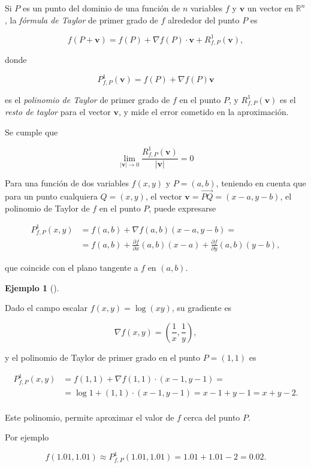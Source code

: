 \documentclass[
  a4paper,
]{scrreport}
\theoremstyle{definition}
\theoremstyle{plain}
\theoremstyle{plain}
\theoremstyle{definition}
\theoremstyle{definition}
\newtheorem{example}{Ejemplo}[chapter]
\theoremstyle{plain}
\theoremstyle{remark}
\begin{document}
Si \(P\) es un punto del dominio de una función de \(n\) variables \(f\)
y \(\mathbf{v}\) un vector en \(\mathbb{R}^n\), la \emph{fórmula de
Taylor} de primer grado de \(f\) alrededor del punto \(P\) es

\[
f(P+\mathbf{v}) = f(P) + \nabla f(P)\cdot \mathbf{v} +R^1_{f,P}(\mathbf{v}),
\]

donde

\[
P^1_{f,P}(\mathbf{v}) = f(P)+\nabla f(P)\mathbf{v}
\]

es el \emph{polinomio de Taylor} de primer grado de \(f\) en el punto
\(P\), y \(R^1_{f,P}(\mathbf{v})\) es el \emph{resto de taylor} para el
vector \(\mathbf{v}\), y mide el error cometido en la aproximación.

Se cumple que

\[
\lim_{|\mathbf{v}|\rightarrow 0} \frac{R^1_{f,P}(\mathbf{v})}{|\mathbf{v}|} = 0
\]

Para una función de dos variables \(f(x,y)\) y \(P=(a, b)\), teniendo en
cuenta que para un punto cualquiera \(Q=(x,y)\), el vector
\(\mathbf{v}=\vec{PQ}=(x-a, y-b)\), el polinomio de Taylor de \(f\) en
el punto \(P\), puede expresarse

\begin{align*}
P^1_{f,P}(x,y) &= f(a,b)+\nabla f(a,b)(x-a,y-b) =\\
&= f(a,b)+\frac{\partial f}{\partial x}(a,b)(x-a)+\frac{\partial f}{\partial y}(a,b)(y-b),
\end{align*}

que coincide con el plano tangente a \(f\) en \((a,b)\).

\begin{example}[]\protect\hypertarget{exm-aproximacion-lineal-funcion-varias-variables}{}\label{exm-aproximacion-lineal-funcion-varias-variables}

Dado el campo escalar \(f(x,y)=\log(xy)\), su gradiente es

\[
\nabla f(x,y) = \left(\frac{1}{x},\frac{1}{y}\right),
\]

y el polinomio de Taylor de primer grado en el punto \(P=(1,1)\) es

\begin{align*}
P^1_{f,P}(x,y) &= f(1,1) +\nabla f(1,1)\cdot (x-1,y-1) = \\
&= \log 1+(1,1)\cdot(x-1,y-1) = x-1+y-1 = x+y-2.\\
\end{align*}

Este polinomio, permite aproximar el valor de \(f\) cerca del punto
\(P\).

Por ejemplo

\[
f(1.01,1.01) \approx P^1_{f,P}(1.01,1.01) = 1.01+1.01-2 = 0.02.
\]

\end{example}
\end{document}
